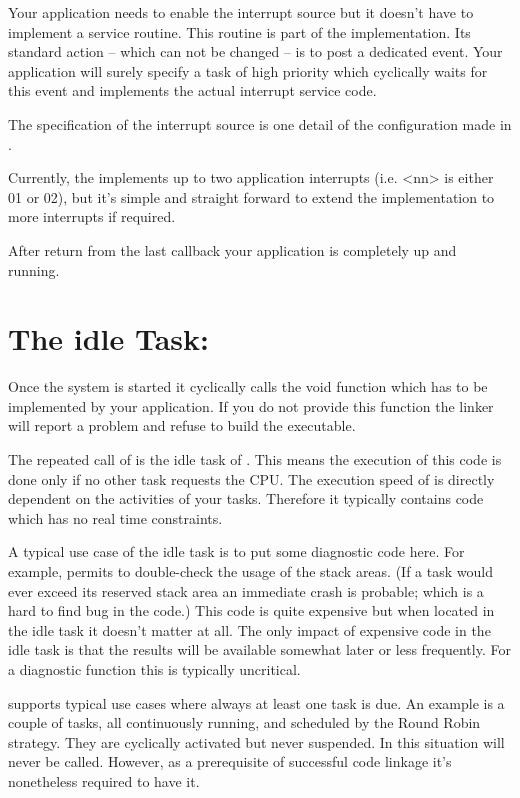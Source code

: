 Your application needs to enable the interrupt source but it doesn't have
to implement a service routine. This routine is part of the \rtos{}
implementation. Its standard action -- which can not be changed -- is to
post a dedicated event. Your application will surely specify a task of
high priority which cyclically waits for this event and implements the
actual interrupt service code.

The specification of the interrupt source is one detail of the \rtos{}
configuration made in .

Currently, the \rtos{} implements up to two application interrupts (i.e.
\textless nn\textgreater{} is either 01 or 02), but it's simple and
straight forward to extend the implementation to more interrupts if
required.

After return from the last callback  your application is completely up and running.


\section{The idle Task: }

Once the system is started it cyclically calls the void function
 which has to be implemented by your application. If you do
not provide this function the linker will report a problem and refuse to
build the executable.

The repeated call of  is the idle task of \rtos{}. This means
the execution of this code is done only if no other task requests the
CPU. The execution speed of  is directly dependent on the
activities of your tasks. Therefore it typically contains code which has
no real time constraints.

A typical use case of the idle task is to put some diagnostic code here.
For example, \rtos{} permits to double-check the usage of the stack areas.
(If a task would ever exceed its reserved stack area an immediate crash is
probable; which is a hard to find bug in the code.) This code is quite
expensive but when located in the idle task it doesn't matter at all. The
only impact of expensive code in the idle task is that the results will be
available somewhat later or less frequently. For a diagnostic function
this is typically uncritical.

\rtos{} supports typical use cases where always at least one task is due.
An example is a couple of tasks, all continuously running, and scheduled
by the Round Robin strategy. They are cyclically activated but never
suspended. In this situation  will never be called. However,
as a prerequisite of successful code linkage it's nonetheless required to
have it.

